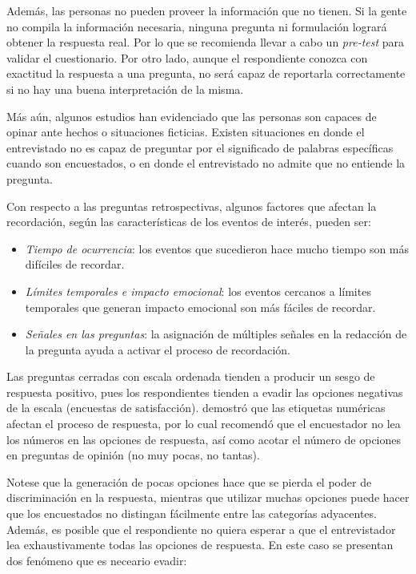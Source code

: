 \documentclass[
  10pt,
  spanish,
]{book}
\providecommand{\tightlist}{%
  \setlength{\itemsep}{0pt}\setlength{\parskip}{0pt}}
\begin{document}
Además, las personas no pueden proveer la información que no tienen. Si la gente no compila la información necesaria, ninguna pregunta ni formulación logrará obtener la respuesta real. Por lo que se recomienda llevar a cabo un \emph{pre-test} para validar el cuestionario. Por otro lado, aunque el respondiente conozca con exactitud la respuesta a una pregunta, no será capaz de reportarla correctamente si no hay una buena interpretación de la misma.

Más aún, algunos estudios han evidenciado que las personas son capaces de opinar ante hechos o situaciones ficticias. Existen situaciones en donde el entrevistado no es capaz de preguntar por el significado de palabras específicas cuando son encuestados, o en donde el entrevistado no admite que no entiende la pregunta.

Con respecto a las preguntas retrospectivas, algunos factores que afectan la recordación, según las características de los eventos de interés, pueden ser:

\begin{itemize}
\tightlist
\item
  \emph{Tiempo de ocurrencia}: los eventos que sucedieron hace mucho tiempo son más difíciles de recordar.
\item
  \emph{Límites temporales e impacto emocional}: los eventos cercanos a límites temporales que generan impacto emocional son más fáciles de recordar.
\item
  \emph{Señales en las preguntas}: la asignación de múltiples señales en la redacción de la pregunta ayuda a activar el proceso de recordación.
\end{itemize}

Las preguntas cerradas con escala ordenada tienden a producir un sesgo de respuesta positivo, pues los respondientes tienden a evadir las opciones negativas de la escala (encuestas de satisfacción). \citet{Schwarz1991} demostró que las etiquetas numéricas afectan el proceso de respuesta, por lo cual recomendó que el encuestador no lea los números en las opciones de respuesta, así como acotar el número de opciones en preguntas de opinión (no muy pocas, no tantas).

Notese que la generación de pocas opciones hace que se pierda el poder de discriminación en la respuesta, mientras que utilizar muchas opciones puede hacer que los encuestados no distingan fácilmente entre las categorías adyacentes. Además, es posible que el respondiente no quiera esperar a que el entrevistador lea exhaustivamente todas las opciones de respuesta. En este caso se presentan dos fenómeno que es neceario evadir:
\end{document}
